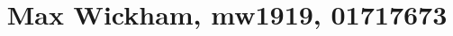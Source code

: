 \documentclass[10pt,twocolumn,letterpaper]{article}
\begin{document}
\title{Max Wickham, mw1919, 01717673}
\maketitle




\end{document}
